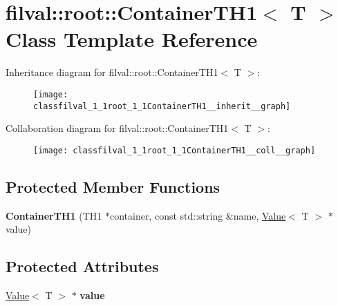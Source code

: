\hypertarget{classfilval_1_1root_1_1ContainerTH1}{}\section{filval\+:\+:root\+:\+:Container\+T\+H1$<$ T $>$ Class Template Reference}
\label{classfilval_1_1root_1_1ContainerTH1}


Inheritance diagram for filval\+:\+:root\+:\+:Container\+T\+H1$<$ T $>$\+:
\nopagebreak
\begin{figure}[H]
\begin{center}
\leavevmode
\texttt{[image: classfilval\_1\_1root\_1\_1ContainerTH1\_\_inherit\_\_graph]}
\end{center}
\end{figure}


Collaboration diagram for filval\+:\+:root\+:\+:Container\+T\+H1$<$ T $>$\+:
\nopagebreak
\begin{figure}[H]
\begin{center}
\leavevmode
\texttt{[image: classfilval\_1\_1root\_1\_1ContainerTH1\_\_coll\_\_graph]}
\end{center}
\end{figure}
\subsection*{Protected Member Functions}
\begin{DoxyCompactItemize}
\item 
\hypertarget{classfilval_1_1root_1_1ContainerTH1_a19a9701125da3aa9882738b4c5c6ae80}{}\label{classfilval_1_1root_1_1ContainerTH1_a19a9701125da3aa9882738b4c5c6ae80} 
{\bfseries Container\+T\+H1} (T\+H1 $\ast$container, const std\+::string \&name, \hyperlink{classfilval_1_1Value}{Value}$<$ T $>$ $\ast$value)
\end{DoxyCompactItemize}
\subsection*{Protected Attributes}
\begin{DoxyCompactItemize}
\item 
\hypertarget{classfilval_1_1root_1_1ContainerTH1_af67ad6f06ba4cfb45f17c6ea2e806149}{}\label{classfilval_1_1root_1_1ContainerTH1_af67ad6f06ba4cfb45f17c6ea2e806149} 
\hyperlink{classfilval_1_1Value}{Value}$<$ T $>$ $\ast$ {\bfseries value}
\end{DoxyCompactItemize}
